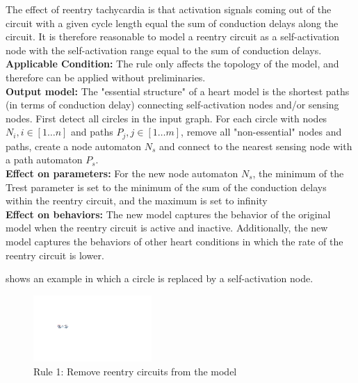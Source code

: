 The effect of reentry tachycardia is that activation signals coming out of the circuit with a given cycle length equal the sum of conduction delays along the circuit.
It is therefore reasonable to model a reentry circuit as a self-activation node with the self-activation range equal to the sum of conduction delays. \\
\textbf{Applicable Condition: } The rule only affects the topology of the model, and therefore can be applied without preliminaries.\\
\textbf{Output model: }The "essential structure" of a heart model is the shortest paths (in terms of conduction delay) connecting self-activation nodes and/or sensing nodes. 
First detect all circles in the input graph. For each circle with nodes $N_i,i\in[1\dots n]$ and paths $P_j,j\in[1\dots m]$, remove all "non-essential" nodes and paths, create a node automaton $N_s$ and connect to the nearest sensing node with a path automaton $P_s$.\\
\textbf{Effect on parameters: }For the new node automaton $N_s$, the minimum of the Trest parameter is set to the minimum of the sum of the conduction delays within the reentry circuit, and the maximum is set to infinity\\
\textbf{Effect on behaviors: }The new model captures the behavior of the original model when the reentry circuit is active and inactive. Additionally, the new model captures the behaviors of other heart conditions in which the rate of the reentry circuit is lower.

 shows an example in which a circle is replaced by a self-activation node.
\begin{figure}[!h]
	\centering
	\includegraphics[width=0.4\textwidth]{figs/rule1.pdf}
	\caption{\small Rule 1: Remove reentry circuits from the model}
	\label{fig:rule1}
\end{figure}
